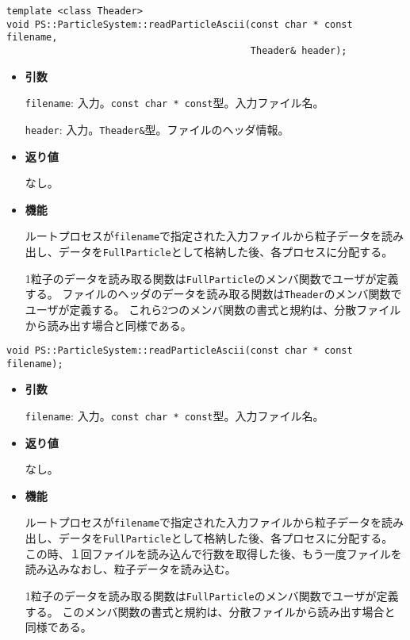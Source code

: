 
\begin{screen}
\begin{verbatim}
template <class Theader>
void PS::ParticleSystem::readParticleAscii(const char * const filename,
                                           Theader& header);
\end{verbatim}
\end{screen}

\begin{itemize}

\item{{\bf 引数}}

{\tt filename}: 入力。{\tt const char * const}型。入力ファイル名。

{\tt header}: 入力。{\tt Theader\&}型。ファイルのヘッダ情報。

\item{{\bf 返り値}}

なし。

\item{{\bf 機能}}

ルートプロセスが{\tt filename}で指定された入力ファイルから粒子データを読み出し、データを{\tt FullParticle}として格納した後、各プロセスに分配する。

1粒子のデータを読み取る関数は{\tt FullParticle}のメンバ関数でユーザが定義する。
ファイルのヘッダのデータを読み取る関数は{\tt Theader}のメンバ関数でユーザが定義する。
これら2つのメンバ関数の書式と規約は、分散ファイルから読み出す場合と同様である。

\end{itemize}


\begin{screen}
\begin{verbatim}
void PS::ParticleSystem::readParticleAscii(const char * const filename);
\end{verbatim}
\end{screen}

\begin{itemize}

\item{{\bf 引数}}

{\tt filename}: 入力。{\tt const char * const}型。入力ファイル名。

\item{{\bf 返り値}}

なし。

\item{{\bf 機能}}

ルートプロセスが{\tt filename}で指定された入力ファイルから粒子データを読み出し、データを{\tt FullParticle}として格納した後、各プロセスに分配する。
この時、１回ファイルを読み込んで行数を取得した後、もう一度ファイルを読み込みなおし、粒子データを読み込む。

1粒子のデータを読み取る関数は{\tt FullParticle}のメンバ関数でユーザが定義する。
このメンバ関数の書式と規約は、分散ファイルから読み出す場合と同様である。

\end{itemize}

